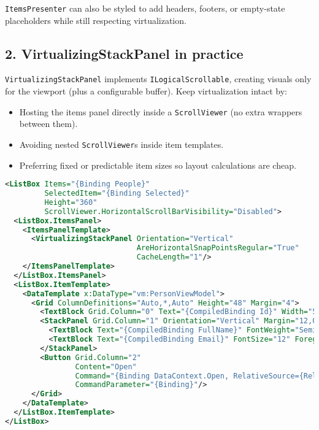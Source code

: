 \passthrough{\lstinline!ItemsPresenter!} can also be styled to add
headers, footers, or empty-state placeholders while still respecting
virtualization.

\subsection{2. VirtualizingStackPanel in
practice}\label{virtualizingstackpanel-in-practice}

\passthrough{\lstinline!VirtualizingStackPanel!} implements
\passthrough{\lstinline!ILogicalScrollable!}, creating visuals only for
the viewport (plus a configurable buffer). Keep virtualization intact
by:

\begin{itemize}
\tightlist
\item
  Hosting the items panel directly inside a
  \passthrough{\lstinline!ScrollViewer!} (no extra wrappers between
  them).
\item
  Avoiding nested \passthrough{\lstinline!ScrollViewer!}s inside item
  templates.
\item
  Preferring fixed or predictable item sizes so layout calculations are
  cheap.
\end{itemize}

\begin{lstlisting}[language=XML]
<ListBox Items="{Binding People}"
         SelectedItem="{Binding Selected}"
         Height="360"
         ScrollViewer.HorizontalScrollBarVisibility="Disabled">
  <ListBox.ItemsPanel>
    <ItemsPanelTemplate>
      <VirtualizingStackPanel Orientation="Vertical"
                              AreHorizontalSnapPointsRegular="True"
                              CacheLength="1"/>
    </ItemsPanelTemplate>
  </ListBox.ItemsPanel>
  <ListBox.ItemTemplate>
    <DataTemplate x:DataType="vm:PersonViewModel">
      <Grid ColumnDefinitions="Auto,*,Auto" Height="48" Margin="4">
        <TextBlock Grid.Column="0" Text="{CompiledBinding Id}" Width="56" HorizontalAlignment="Right"/>
        <StackPanel Grid.Column="1" Orientation="Vertical" Margin="12,0" Spacing="2">
          <TextBlock Text="{CompiledBinding FullName}" FontWeight="SemiBold"/>
          <TextBlock Text="{CompiledBinding Email}" FontSize="12" Foreground="#6B7280"/>
        </StackPanel>
        <Button Grid.Column="2"
                Content="Open"
                Command="{Binding DataContext.Open, RelativeSource={RelativeSource AncestorType=ListBox}}"
                CommandParameter="{Binding}"/>
      </Grid>
    </DataTemplate>
  </ListBox.ItemTemplate>
</ListBox>
\end{lstlisting}

